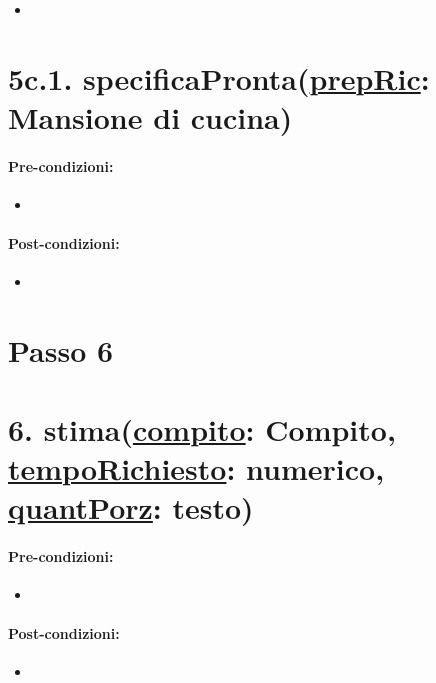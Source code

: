 \begin{itemize}
  \item 
\end{itemize}

\section*{5c.1. specificaPronta(\underline{prepRic}: Mansione di cucina)}

\paragraph{Pre-condizioni:}

\begin{itemize}
  \item 
\end{itemize}

\paragraph{Post-condizioni:}

\begin{itemize}
  \item 
\end{itemize}

\section{Passo 6}

\section*{6. stima(\underline{compito}: Compito, \underline{tempoRichiesto}: numerico, \underline{quantPorz}: testo)}

\paragraph{Pre-condizioni:}

\begin{itemize}
  \item 
\end{itemize}

\paragraph{Post-condizioni:}

\begin{itemize}
  \item 
\end{itemize}

